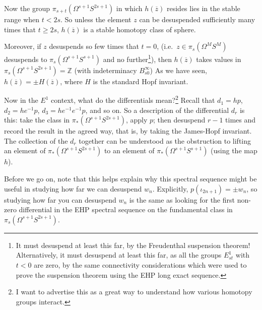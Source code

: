 \documentclass{article}
\newcommand{\Z}{\mathbb{Z}}
\newcommand{\Loops}{\Omega}
\theoremstyle{definition}
\begin{document}
\begin{enumerate}
Now the group $\pi_{s+t}(\Omega^{s+1}S^{2s+1})$ in which $h(\overline z)$ resides lies in the stable range when $t<2s$. So unless the element $z$ can be desuspended sufficiently many times that $t\geq2s$, $h(\overline z)$ is a stable homotopy class of sphere.

Moreover, if $z$ desuspends so few times that $t=0$, (i.e.\ $z\in\pi_s(\Omega^M S^M)$ desuspends to $\pi_s(\Omega^{s+1} S^{s+1})$ and no further\footnote{It must desuspend at least this far, by the Freudenthal suspension theorem! Alternatively, it must desuspend at least this far, as all the groups $E_{st}^1$ with $t<0$ are zero, by the same connectivity considerations which were used to prove the suspension theorem using the EHP long exact sequence.}), then $h(\overline z)$ takes values in $\pi_{s}(\Omega^{s+1}S^{2s+1})=\Z$ (with indeterminacy $B_{s0}^\infty$) As we have seen, $h(\overline z)=\pm H(\overline z)$, where $H$ is the standard Hopf invariant.
\end{enumerate}



Now in the $E^1$ context, what do the differentials mean?\footnote{I want to advertise this as a great way to understand how various homotopy groups interact.}  Recall that $d_1 = hp$, $d_2 = he^{-1} p$, $d_3 = he^{-1} e^{-1} p$, and so on.  So a description of the differential $d_r$ is this: take the class in $\pi_* (\Loops^{s+1} S^{2s+1})$, apply $p$; then desuspend $r-1$ times and record the result in the agreed way, that is, by taking the James-Hopf invariant. The collection of the $d_r$ together can be understood as the obstruction to lifting an element of $\pi_*(\Loops^{s+1} S^{2s+1})$ to an element of $\pi_*(\Loops^{s+1} S^{s+1})$ (using the map $h$).

Before we go on, note that this helps explain why this spectral sequence might be useful in studying how far we can desuspend $w_n$. Explicitly, $p(\iota_{2n+1}) = \pm w_n$, so studying how far you can desuspend $w_n$ is the same as looking for the first non-zero differential in the EHP spectral sequence on the fundamental class in $\pi_s (\Loops^{s+1} S^{2s+1})$.
\end{document}
